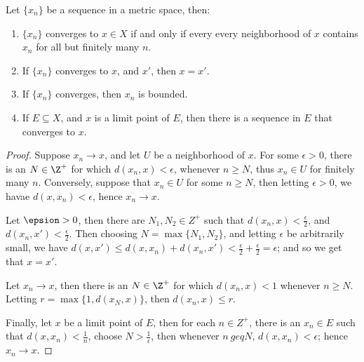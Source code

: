 \begin{theorem}\label{3.1.1}
    Let $\{x_n\}$ be a sequence in a metric space, then:
        \begin{enumerate}[label=(\arabic*)]
            \item $\{x_n\}$ converges to  $x \in X$ if and only if every every neighborhood 
                of $x$ contains  $x_n$ for all but finitely many  $n$.

            \item If  $\{x_n\}$ converges to  $x$, and  $x'$, then $x=x'$.

            \item If  $\{x_n\}$ converges, then  $x_n$ is bounded.

            \item If  $E \subseteq X$, and  $x$ is a limit point of  $E$, then there 
                is a sequence  in  $E$ that converges to  $x$.
        \end{enumerate}
\end{theorem}
\begin{proof}
    Suppose $x_n \rightarrow x$, and let  $U$ be a neighborhood of  $x$. For some  $\epsilon>0$, 
    there is an $N \in \Z^+$ for which $d(x_n,x)<\epsilon$, whenever $n \geq N$, thus 
    $x_n \in U$ for finitely many  $n$. Conversely, suppose that  $x_n \in U$ for 
    some  $n \geq N$, then  letting  $\epsilon>0$, we havae  $d(x,x_n)<\epsilon$, hence 
    $x_n \rightarrow x$.

    Let  $\epsion>0$, then there are $N_1,N_2 \in Z^+$ such that $d(x_n,x)<\frac{\epsilon}{2}$, 
    and $d(x_n,x')<\frac{\epsilon}{2}$. Then choosing $N=\max\{N_1,N_2\}$, and letting 
    $\epsilon$ be arbitrarily small, we have  $d(x,x') \leq d(x,x_n)+d(x_n,x')<\frac{\epsilon}{2}+
    \frac{\epsilon}{2}=\epsilon$; and so we get that $x=x'$.

    Let  $x_n \rightarrow x$, then there is an  $N \in \Z^+$ for which  $d(x_n,x)<1$ whenever 
    $n \geq N$. Letting  $r=\max\{1,d(x_N,x)\}$, then  $d(x_n,x) \leq r$.

    Finally, let $x$ be a limit point of  $E$, then for each  $n \in Z^+$, there is an  $x_n \in E$ 
    such that  $d(x,x_n)<\frac{1}{n}$, choose $N>\frac{1}{\epsilon}$, then whenever $n\ geq N$, 
    $d(x,x_n)<\epsilon$; hence  $x_n \rightarrow x$.
\end{proof}

